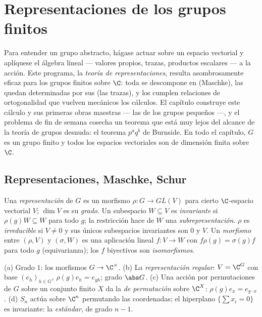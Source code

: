 \chapter{Representaciones de los grupos
finitos}\label{ch:b3:representations}

Para entender un grupo abstracto, hágase actuar sobre un espacio
vectorial y aplíquese el álgebra lineal --- valores propios, trazas,
productos escalares --- a la acción. Este programa, la \emph{teoría de
representaciones}, resulta
asombrosamente eficaz para los grupos finitos sobre $\C$: toda
 se descompone en
 (Maschke), las
 quedan determinadas
por sus \emph{}
(las trazas), y los
 cumplen relaciones
de ortogonalidad que vuelven mecánicos los cálculos. El capítulo
construye este cálculo y sus primeras obras maestras --- las
 de los
grupos pequeños ---, y el problema de fin de semana cosecha un teorema
que está muy lejos del alcance de la teoría de grupos desnuda: el
teorema $p^aq^b$ de Burnside. En todo el capítulo, $G$ es un grupo
finito y todos los espacios vectoriales son de dimensión finita sobre
$\C$.

\section{Representaciones, Maschke, Schur}

\begin{definition}\label{def:b3:representations:rep}
Una \emph{representación} de $G$ es un morfismo
$\rho \colon G \to GL(V)$ para cierto $\C$-espacio vectorial $V$;
$\dim V$ es su \emph{grado}. Un subespacio $W \subseteq V$ es
\emph{invariante} si $\rho(g)W \subseteq W$ para todo $g$; la
restricción hace de $W$ una \emph{subrepresentación}. $\rho$ es
\emph{irreducible} si $V \neq
0$ y sus únicos subespacios invariantes son $0$ y $V$. Un
\emph{morfismo} entre $(\rho, V)$ y $(\sigma, W)$ es una aplicación
lineal $f\colon V \to W$ con $f\rho(g) = \sigma(g)f$ para todo $g$
(equivarianza); los $f$ biyectivos son \emph{isomorfismos}.
\end{definition}

\begin{example}\label{ex:b3:representations:examples}
(a) Grado $1$: los morfismos $G \to \C^\times$. (b) La
\emph{representación regular}: $V = \C^G$
con base $(e_h)_{h \in G}$, $\rho(g)e_h = e_{gh}$; grado $\abs G$. (c)
Una acción por permutaciones de $G$ sobre un conjunto finito $X$ da la
\emph{ de
permutación} sobre $\C^X$: $\rho(g)e_x =
e_{g\cdot x}$. (d) $S_n$ actúa sobre $\C^n$ permutando las coordenadas;
el hiperplano $\{\sum x_i = 0\}$ es invariante: la
\emph{ estándar}, de
grado $n - 1$.
\end{example}

